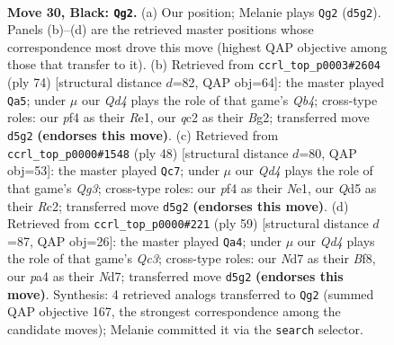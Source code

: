 \documentclass[11pt]{article}
\begin{document}
\clearpage

\begin{figure}[p]\centering
\begin{subfigure}{0.46\textwidth}\centering
\resizebox{\linewidth}{!}{%
\newchessgame
\chessboard[
  setfen={1rb3k1/p2n1r1p/5b2/2pq4/Pp1p1P2/1P4N1/R1Q1P3/1NB1K2R b - - 7 30},
  showmover=false,
  pgfstyle=straightmove, color=movearrow, markmove={d5-g2}
]}
\caption{}
\end{subfigure}\hfill
\begin{subfigure}{0.46\textwidth}\centering
\resizebox{\linewidth}{!}{%
\newchessgame
\chessboard[
  setfen={2r3k1/pb6/3rn3/1P1pqpp1/PQp5/2N1P1P1/5PB1/2R1R1K1 w - - 4 38},
  showmover=false,
  pgfstyle=straightmove, color=movearrow, markmove={b4-a5}
]}
\caption{}
\end{subfigure}
\\[4pt]
\begin{subfigure}{0.46\textwidth}\centering
\resizebox{\linewidth}{!}{%
\newchessgame
\chessboard[
  setfen={r5k1/1b1nqp2/4r2p/2p3p1/3P4/1P4QP/2R1BPP1/2R1N1K1 w - - 1 25},
  showmover=false,
  pgfstyle=straightmove, color=movearrow, markmove={g3-c7}
]}
\caption{}
\end{subfigure}\hfill
\begin{subfigure}{0.46\textwidth}\centering
\resizebox{\linewidth}{!}{%
\newchessgame
\chessboard[
  setfen={r4bk1/3n1p1p/2qpr1p1/2p5/2P5/1R2PP1P/2Q3PB/3R1NK1 b - - 4 30},
  showmover=false,
  pgfstyle=straightmove, color=movearrow, markmove={c6-a4}
]}
\caption{}
\end{subfigure}
\caption{\textbf{Move 30, Black: \texttt{Qg2}.} (a) Our position; Melanie plays \texttt{Qg2} (\texttt{d5g2}). Panels (b)--(d) are the retrieved master positions whose correspondence most drove this move (highest QAP objective among those that transfer to it). (b) Retrieved from \texttt{ccrl\_top\_p0003\#2604} (ply 74) [structural distance $d$=82, QAP obj=64]: the master played \texttt{Qa5}; under $\mu$ our \emph{Qd4} plays the role of that game's \emph{Qb4}; cross-type roles: our \emph{p}f4 as their \emph{R}e1, our \emph{q}c2 as their \emph{B}g2; transferred move \texttt{d5g2} \textbf{(endorses this move)}. (c) Retrieved from \texttt{ccrl\_top\_p0000\#1548} (ply 48) [structural distance $d$=80, QAP obj=53]: the master played \texttt{Qc7}; under $\mu$ our \emph{Qd4} plays the role of that game's \emph{Qg3}; cross-type roles: our \emph{p}f4 as their \emph{N}e1, our \emph{Q}d5 as their \emph{R}c2; transferred move \texttt{d5g2} \textbf{(endorses this move)}. (d) Retrieved from \texttt{ccrl\_top\_p0000\#221} (ply 59) [structural distance $d$=87, QAP obj=26]: the master played \texttt{Qa4}; under $\mu$ our \emph{Qd4} plays the role of that game's \emph{Qc3}; cross-type roles: our \emph{N}d7 as their \emph{B}f8, our \emph{p}a4 as their \emph{N}d7; transferred move \texttt{d5g2} \textbf{(endorses this move)}. Synthesis: 4 retrieved analogs transferred to \texttt{Qg2} (summed QAP objective 167, the strongest correspondence among the candidate moves); Melanie committed it via the \texttt{search} selector.}
\label{fig:thought-m59}
\end{figure}
\end{document}
